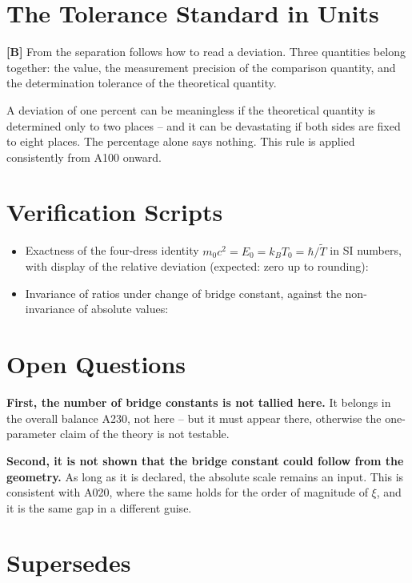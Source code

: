 \section{The Tolerance Standard in Units}

\textbf{[B]} From the separation follows how to read a deviation. Three
quantities belong together: the value, the measurement precision of the
comparison quantity, and the determination tolerance of the theoretical quantity.

A deviation of one percent can be meaningless if the theoretical quantity is
determined only to two places -- and it can be devastating if both sides are
fixed to eight places. The percentage alone says nothing. This rule is applied
consistently from A100 onward.

\section{Verification Scripts}

\begin{itemize}
  \item Exactness of the four-dress identity $m_0c^2=E_0=k_BT_0=\hbar/\tilde T$
    in SI numbers, with display of the relative deviation (expected: zero up to
    rounding): 
  \item Invariance of ratios under change of bridge constant, against the
    non-invariance of absolute values:
\end{itemize}

\section{Open Questions}

\textbf{First, the number of bridge constants is not tallied here.} It belongs
in the overall balance A230, not here -- but it must appear there, otherwise
the one-parameter claim of the theory is not testable.

\textbf{Second, it is not shown that the bridge constant could follow from the
geometry.} As long as it is declared, the absolute scale remains an input.
This is consistent with A020, where the same holds for the order of magnitude
of $\xi$, and it is the same gap in a different guise.

\section{Supersedes}

